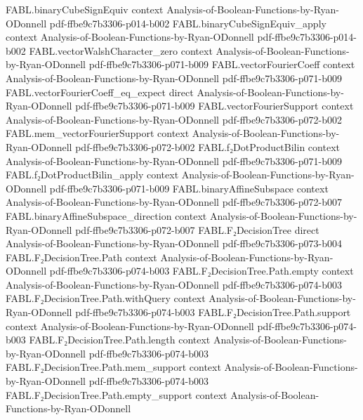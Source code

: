\begin{theorem}
\proofstep
  {FABL.binaryCubeSignEquiv}
  {context}
  {Analysis-of-Boolean-Functions-by-Ryan-ODonnell}
  {pdf-ffbe9c7b3306-p014-b002}
\proofstep
  {FABL.binaryCubeSignEquiv_apply}
  {context}
  {Analysis-of-Boolean-Functions-by-Ryan-ODonnell}
  {pdf-ffbe9c7b3306-p014-b002}
\proofstep
  {FABL.vectorWalshCharacter_zero}
  {context}
  {Analysis-of-Boolean-Functions-by-Ryan-ODonnell}
  {pdf-ffbe9c7b3306-p071-b009}
\proofstep
  {FABL.vectorFourierCoeff}
  {context}
  {Analysis-of-Boolean-Functions-by-Ryan-ODonnell}
  {pdf-ffbe9c7b3306-p071-b009}
\proofstep
  {FABL.vectorFourierCoeff_eq_expect}
  {direct}
  {Analysis-of-Boolean-Functions-by-Ryan-ODonnell}
  {pdf-ffbe9c7b3306-p071-b009}
\proofstep
  {FABL.vectorFourierSupport}
  {context}
  {Analysis-of-Boolean-Functions-by-Ryan-ODonnell}
  {pdf-ffbe9c7b3306-p072-b002}
\proofstep
  {FABL.mem_vectorFourierSupport}
  {context}
  {Analysis-of-Boolean-Functions-by-Ryan-ODonnell}
  {pdf-ffbe9c7b3306-p072-b002}
\proofstep
  {FABL.f₂DotProductBilin}
  {context}
  {Analysis-of-Boolean-Functions-by-Ryan-ODonnell}
  {pdf-ffbe9c7b3306-p071-b009}
\proofstep
  {FABL.f₂DotProductBilin_apply}
  {context}
  {Analysis-of-Boolean-Functions-by-Ryan-ODonnell}
  {pdf-ffbe9c7b3306-p071-b009}
\proofstep
  {FABL.binaryAffineSubspace}
  {context}
  {Analysis-of-Boolean-Functions-by-Ryan-ODonnell}
  {pdf-ffbe9c7b3306-p072-b007}
\proofstep
  {FABL.binaryAffineSubspace_direction}
  {context}
  {Analysis-of-Boolean-Functions-by-Ryan-ODonnell}
  {pdf-ffbe9c7b3306-p072-b007}
\proofstep
  {FABL.F₂DecisionTree}
  {direct}
  {Analysis-of-Boolean-Functions-by-Ryan-ODonnell}
  {pdf-ffbe9c7b3306-p073-b004}
\proofstep
  {FABL.F₂DecisionTree.Path}
  {context}
  {Analysis-of-Boolean-Functions-by-Ryan-ODonnell}
  {pdf-ffbe9c7b3306-p074-b003}
\proofstep
  {FABL.F₂DecisionTree.Path.empty}
  {context}
  {Analysis-of-Boolean-Functions-by-Ryan-ODonnell}
  {pdf-ffbe9c7b3306-p074-b003}
\proofstep
  {FABL.F₂DecisionTree.Path.withQuery}
  {context}
  {Analysis-of-Boolean-Functions-by-Ryan-ODonnell}
  {pdf-ffbe9c7b3306-p074-b003}
\proofstep
  {FABL.F₂DecisionTree.Path.support}
  {context}
  {Analysis-of-Boolean-Functions-by-Ryan-ODonnell}
  {pdf-ffbe9c7b3306-p074-b003}
\proofstep
  {FABL.F₂DecisionTree.Path.length}
  {context}
  {Analysis-of-Boolean-Functions-by-Ryan-ODonnell}
  {pdf-ffbe9c7b3306-p074-b003}
\proofstep
  {FABL.F₂DecisionTree.Path.mem_support}
  {context}
  {Analysis-of-Boolean-Functions-by-Ryan-ODonnell}
  {pdf-ffbe9c7b3306-p074-b003}
\proofstep
  {FABL.F₂DecisionTree.Path.empty_support}
  {context}
  {Analysis-of-Boolean-Functions-by-Ryan-ODonnell}

\end{theorem}
